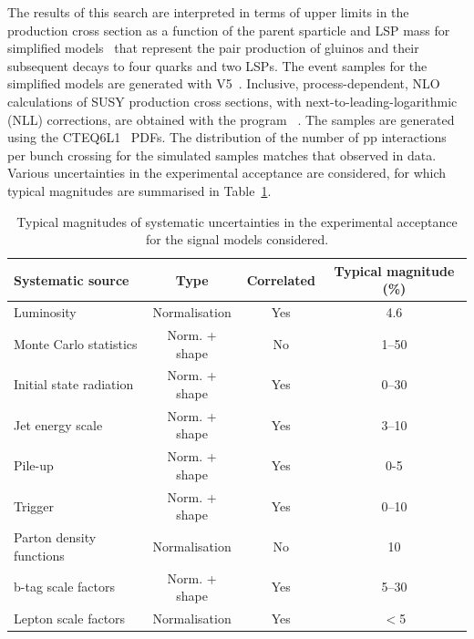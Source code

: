 The results of this search are interpreted in terms of upper limits in
the production cross section as a function of the parent sparticle and
LSP mass for simplified models~\cite{Alwall:2008ag, Alwall:2008va,
  sms} that represent the pair production of gluinos and their
subsequent decays to four quarks and two LSPs. The event samples for
the simplified models are generated with \MADGRAPH V5~\cite{madgraph}.
Inclusive, process-dependent, NLO calculations of SUSY production
cross sections, with next-to-leading-logarithmic (NLL) corrections,
are obtained with the program \PROSPINO~\cite{Beenakker:1996ch,
  PhysRevD.80.095004,PhysRevLett.102.111802, PhysRevD.80.095004,
  1126-6708-2009-12-041, doi:10.1142/S0217751X11053560,
  susy-nlo-nll}. The samples are generated using the
CTEQ6L1~\cite{Pumplin:2002vw} PDFs. The distribution of the number of
pp interactions per bunch crossing for the simulated samples matches
that observed in data. Various uncertainties in the experimental
acceptance are considered, for which typical magnitudes are summarised
in Table~\ref{tab:signal_systs}.

\begin{table}[h!]
  \caption{%
    Typical magnitudes of systematic uncertainties in the experimental
    acceptance for the signal models considered.
  }
  \label{tab:signal_systs}
  \centering
  \footnotesize
  \begin{tabular}{ lccc }
    \hline
    \hline
    Systematic source              & Type          & Correlated & Typical magnitude (\%) \\
    \hline
    Luminosity                     & Normalisation & Yes        & 4.6                    \\
    Monte Carlo statistics         & Norm. + shape & No         & 1--50                  \\
    Initial state radiation        & Norm. + shape & Yes        & 0--30                  \\
    Jet energy scale               & Norm. + shape & Yes        & 3--10                  \\
    Pile-up                        & Norm. + shape & Yes        & 0-5                    \\
    Trigger                        & Norm. + shape & Yes        & 0--10                  \\
    Parton density functions       & Normalisation & No         & 10                     \\
    b-tag scale factors            & Norm. + shape & Yes        & 5--30                  \\
    Lepton scale factors           & Normalisation & Yes        & $<$5                   \\
    \hline
    \hline
  \end{tabular}
\end{table}

